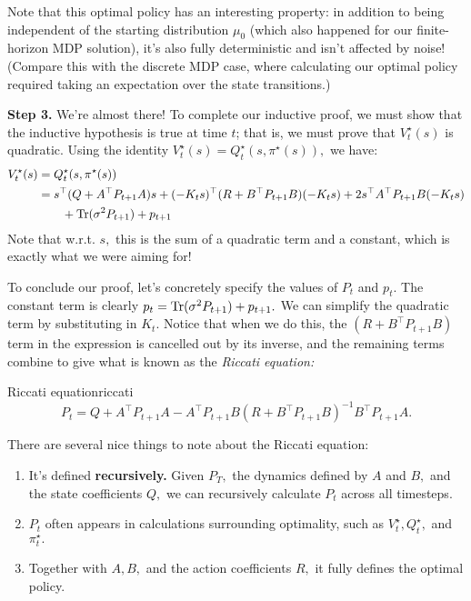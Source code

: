\documentclass[../main/main]{subfiles}
\begin{document}
Note that this optimal policy has an interesting property: in addition to being
independent of the starting distribution $\mu_0$ (which also happened for our
finite-horizon MDP solution), it's also fully deterministic and isn't affected by noise!
(Compare this with the discrete MDP case, where calculating our optimal policy
required taking an expectation over the state transitions.)

\textbf{Step 3.} We're almost there! To complete our inductive proof, we must show that the
inductive hypothesis is true at time $t$; that is, we must prove that
$V^\star_t(s)$ is quadratic.
Using the identity $V^\star_t(s) = Q^\star_t(s, \pi^\star(s)),$ we have: \begin{align*}
    V^\star_t(s) &= Q^\star_t(s, \pi^\star(s)) \\
    &= s^\top (Q + A^\top P_{t+1} A) s + (-K_t s)^\top (R + B^\top P_{t+1} B) (-K_t s)
    + 2s^\top A^\top P_{t+1} B (-K_t s) \\
        &\qquad + \operatorname*{\textrm{Tr}}(\sigma^2 P_{t+1}) + p_{t+1}
\end{align*}
Note that w.r.t. $s,$ this is the sum of a quadratic term and a constant,
which is exactly what we were aiming for!

To conclude our proof, let's concretely specify the values of $P_t$ and $p_t.$
The constant term is clearly $p_t = \operatorname*{\textrm{Tr}}(\sigma^2 P_{t+1}) + p_{t+1}.$
We can simplify the quadratic term by substituting in $K_t.$
Notice that when we do this, the $(R+B^\top P_{t+1} B)$ term in
the expression is cancelled out by its inverse, and the remaining terms combine to give
what is known as the \emph{Riccati equation:}

\begin{theorem}{Riccati equation}{riccati}
    \[
        P_t = Q + A^\top P_{t+1} A - A^\top P_{t+1} B (R + B^\top P_{t+1} B)^{-1} B^\top P_{t+1} A.
    \]
\end{theorem}

There are several nice things to note about the Riccati equation:
\begin{enumerate}
    \item It's defined \textbf{recursively.} Given $P_T,$ the dynamics defined by $A$ and $B,$ and the state coefficients $Q,$ we can
    recursively calculate $P_t$ across all timesteps.
    \item $P_t$ often appears in calculations surrounding optimality, such as $V^\star_t, Q^\star_t,$ and $\pi^\star_t.$
    \item Together with $A, B,$ and the action coefficients $R,$ it fully defines the optimal policy.
\end{enumerate}
\end{document}
